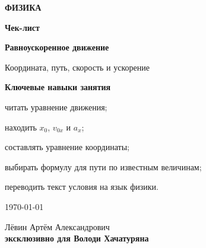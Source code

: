\documentclass[a4paper,12pt]{article}
\begin{document}
\thispagestyle{empty}

\begin{center}

\vspace*{27mm}

{\Large\color{accent}\textbf{ФИЗИКА}}

\vspace{13mm}

{\Huge\bfseries\color{darkaccent}
Чек-лист}

\vspace{5mm}

{\LARGE\bfseries
Равноускоренное движение}

\vspace{4mm}

{\Large
Координата, путь, скорость и ускорение}

\vspace{20mm}

{\large
\textbf{Ключевые навыки занятия}}

\vspace{5mm}

\begin{minipage}{0.78\linewidth}
\centering
\large
читать уравнение движения;

\vspace{2mm}
находить \(x_0\), \(v_{0x}\) и \(a_x\);

\vspace{2mm}
составлять уравнение координаты;

\vspace{2mm}
выбирать формулу для пути по известным величинам;

\vspace{2mm}
переводить текст условия на язык физики.
\end{minipage}

\vfill

{\large \today}

\vspace{9mm}

{\large
Лёвин Артём Александрович\\[2mm]
\textbf{эксклюзивно для Володи Хачатуряна}}

\vspace{25mm}


\end{center}
\end{document}
